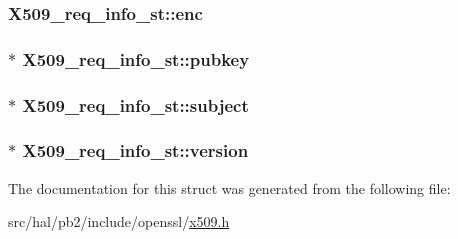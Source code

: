 \subsubsection[{\texorpdfstring{enc}{enc}}]{ X509\+\_\+req\+\_\+info\+\_\+st\+::enc}\hypertarget{struct_x509__req__info__st_a7db85d33e14e55ab747c4c28ed259ba5}{}\label{struct_x509__req__info__st_a7db85d33e14e55ab747c4c28ed259ba5}
\subsubsection[{\texorpdfstring{pubkey}{pubkey}}]{$\ast$ X509\+\_\+req\+\_\+info\+\_\+st\+::pubkey}\hypertarget{struct_x509__req__info__st_a6aa13ec7edfacffb598f1c024c28ad46}{}\label{struct_x509__req__info__st_a6aa13ec7edfacffb598f1c024c28ad46}
\subsubsection[{\texorpdfstring{subject}{subject}}]{$\ast$ X509\+\_\+req\+\_\+info\+\_\+st\+::subject}\hypertarget{struct_x509__req__info__st_a58cdac102c16aadc3617e2f430b966c2}{}\label{struct_x509__req__info__st_a58cdac102c16aadc3617e2f430b966c2}
\subsubsection[{\texorpdfstring{version}{version}}]{$\ast$ X509\+\_\+req\+\_\+info\+\_\+st\+::version}\hypertarget{struct_x509__req__info__st_a3f5f148e75b34d4cdce959b0a744d7db}{}\label{struct_x509__req__info__st_a3f5f148e75b34d4cdce959b0a744d7db}


The documentation for this struct was generated from the following file\+:\begin{DoxyCompactItemize}
\item 
src/hal/pb2/include/openssl/\hyperlink{x509_8h}{x509.\+h}\end{DoxyCompactItemize}
